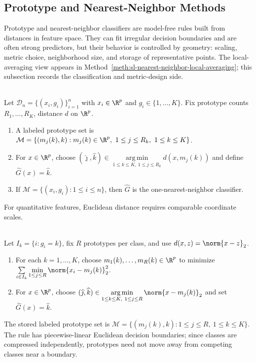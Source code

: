 \subsection{Prototype and Nearest-Neighbor Methods}

Prototype and nearest-neighbor classifiers are model-free rules built from distances in feature space.  They can fit irregular decision boundaries and are often strong predictors, but their behavior is controlled by geometry: scaling, metric choice, neighborhood size, and storage of representative points.  The local-averaging view appears in Method~\ref{meth:sl-nearest-neighbor-local-averaging}; this subsection records the classification and metric-design side.

\begin{definition} \label{def:sl-prototype-classifier} \\
Let $\mathcal{D}_n=\{(x_i,g_i)\}_{i=1}^n$ with $x_i\in\R^p$ and $g_i\in\{1,\ldots,K\}$.  Fix prototype counts $R_1,\ldots,R_K$, distance $d$ on $\R^p$.
\begin{enumerate}[label=(\roman*)]
\setlength{\itemsep}{0pt}
\item A labeled prototype set is $\mathcal{M}=\{(m_j(k),k):m_j(k)\in\R^p,\ 1\leq j\leq R_k,\ 1\leq k\leq K\}$.
\item For $x\in\R^p$, choose $(\widehat{\jmath},\widehat{k})\in\operatorname*{arg\,min}\limits_{1\leq k\leq K,\ 1\leq j\leq R_k}d(x,m_j(k))$ and define $\widehat{G}(x)=\widehat{k}$.
\item If $\mathcal{M}=\{(x_i,g_i):1\leq i\leq n\}$, then $\widehat{G}$ is the one-nearest-neighbor classifier.
\end{enumerate}
For quantitative features, Euclidean distance requires comparable coordinate scales.
\end{definition}

\begin{method} \label{meth:sl-kmeans-prototype-classifier} \\
Let $I_k=\{i:g_i=k\}$, fix $R$ prototypes per class, and use $d(x,z)=\norm{x-z}_2$.
\begin{enumerate}[label=(\roman*)]
\setlength{\itemsep}{0pt}
\item For each $k=1,\ldots,K$, choose $m_1(k),\ldots,m_R(k)\in\R^p$ to minimize $\sum\limits_{i\in I_k}\min\limits_{1\leq j\leq R}\norm{x_i-m_j(k)}_2^2$.
\item For $x\in\R^p$, choose $(\widehat{\jmath},\widehat{k})\in\operatorname*{arg\,min}\limits_{1\leq k\leq K,\ 1\leq j\leq R}\norm{x-m_j(k)}_2$ and set $\widehat{G}(x)=\widehat{k}$.
\end{enumerate}
The stored labeled prototype set is $\mathcal{M}=\{(m_j(k),k):1\leq j\leq R,\ 1\leq k\leq K\}$.\\
The rule has piecewise-linear Euclidean decision boundaries; since classes are compressed independently, prototypes need not move away from competing classes near a boundary.
\end{method}

